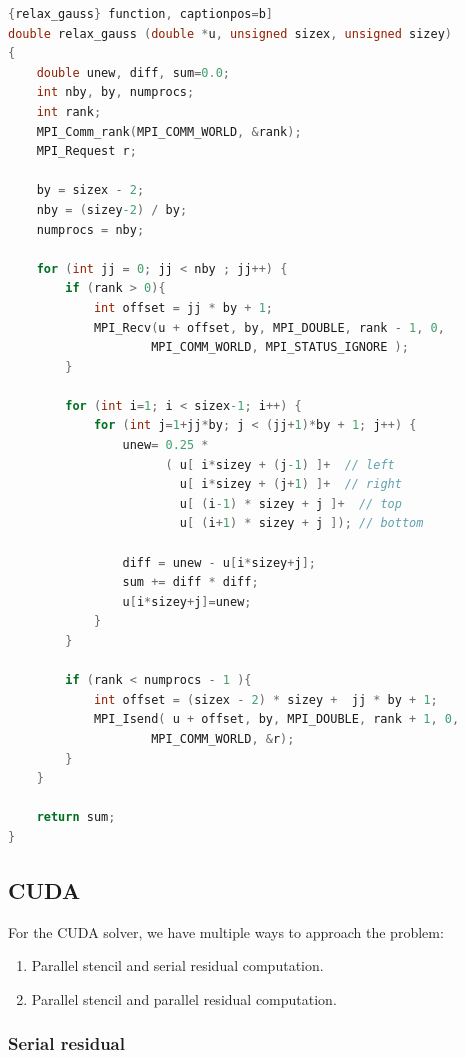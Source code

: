 \documentclass[titlepage]{article}
\newcommand{\incode}[1]{\lstinline[style=inlineC,language=C]{#1}}
\begin{document}
\begin{lstlisting}[label=code:mpi_relax_gauss,style=c, language=C, caption=MPI \incode{relax_gauss} function, captionpos=b]
double relax_gauss (double *u, unsigned sizex, unsigned sizey)
{
    double unew, diff, sum=0.0;
    int nby, by, numprocs;
    int rank;
    MPI_Comm_rank(MPI_COMM_WORLD, &rank);
    MPI_Request r;

    by = sizex - 2;
    nby = (sizey-2) / by;
    numprocs = nby;

    for (int jj = 0; jj < nby ; jj++) {
        if (rank > 0){
            int offset = jj * by + 1;
            MPI_Recv(u + offset, by, MPI_DOUBLE, rank - 1, 0, 
                    MPI_COMM_WORLD, MPI_STATUS_IGNORE );
        }

        for (int i=1; i < sizex-1; i++) {
            for (int j=1+jj*by; j < (jj+1)*by + 1; j++) {
                unew= 0.25 * 
                      ( u[ i*sizey + (j-1) ]+  // left
                        u[ i*sizey + (j+1) ]+  // right
                        u[ (i-1) * sizey + j ]+  // top
                        u[ (i+1) * sizey + j ]); // bottom

                diff = unew - u[i*sizey+j];
                sum += diff * diff; 
                u[i*sizey+j]=unew;
            }
        }

        if (rank < numprocs - 1 ){
            int offset = (sizex - 2) * sizey +  jj * by + 1;
            MPI_Isend( u + offset, by, MPI_DOUBLE, rank + 1, 0, 
                    MPI_COMM_WORLD, &r);
        }
    }

    return sum;
}
\end{lstlisting}

\subsection{CUDA}

For the CUDA solver, we have multiple ways to approach the problem:

\begin{enumerate}
    \item Parallel stencil and serial residual computation.
    \item Parallel stencil and parallel residual computation.
\end{enumerate}

\subsubsection{Serial residual}
\end{document}
